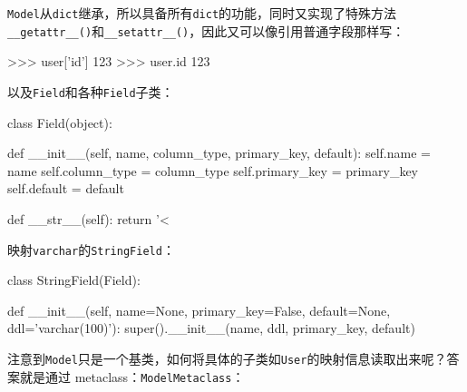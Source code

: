 \texttt{Model}从\texttt{dict}继承，所以具备所有\texttt{dict}的功能，同时又实现了特殊方法\texttt{\_\_getattr\_\_()}和\texttt{\_\_setattr\_\_()}，因此又可以像引用普通字段那样写：

\begin{pythoncode}
>>> user['id']
123
>>> user.id
123
\end{pythoncode}

以及\texttt{Field}和各种\texttt{Field}子类：

\begin{pythoncode}
class Field(object):

    def __init__(self, name, column_type, primary_key, default):
        self.name = name
        self.column_type = column_type
        self.primary_key = primary_key
        self.default = default

    def __str__(self):
        return '<%
\end{pythoncode}

映射\texttt{varchar}的\texttt{StringField}：

\begin{pythoncode}
class StringField(Field):

    def __init__(self, name=None, primary_key=False, default=None, ddl='varchar(100)'):
        super().__init__(name, ddl, primary_key, default)
\end{pythoncode}

注意到\texttt{Model}只是一个基类，如何将具体的子类如\texttt{User}的映射信息读取出来呢？答案就是通过
metaclass：\texttt{ModelMetaclass}：

